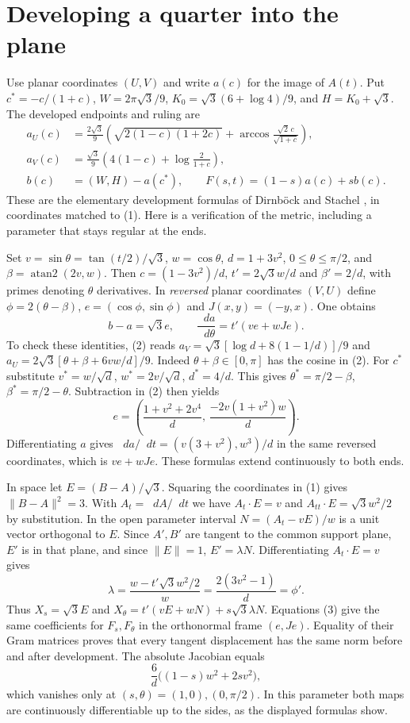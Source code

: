 \documentclass[11pt,letterpaper]{article}
\newcommand{\heading}[1]{\section*{\color{ink}#1}}
\newcommand{\norm}[1]{\lVert #1\rVert}
\newcommand{\rt}{\sqrt{3}}
\newcommand{\dd}{\mathop{}\!d}
\begin{document}
\newpage
\heading{Developing a quarter into the plane}
Use planar coordinates $(U,V)$ and write $a(c)$ for the image of $A(t)$. Put $c^*=-c/(1+c)$, $W=2\pi\rt/9$, $K_0=\rt(6+\log4)/9$, and $H=K_0+\rt$. The developed endpoints and ruling are
\begin{align}
 a_U(c)&=\frac{2\rt}{9}\left(\sqrt{2(1-c)(1+2c)}
              +\arccos\frac{\sqrt2\,c}{\sqrt{1+c}}\right),\nonumber\\
 a_V(c)&=\frac{\rt}{9}\left(4(1-c)+\log\frac2{1+c}\right),\nonumber\\
 b(c)&=(W,H)-a(c^*),\qquad F(s,t)=(1-s)a(c)+s b(c).
 \tag{2}
\end{align}
These are the elementary development formulas of Dirnböck and Stachel \cite{ds}, in coordinates matched to (1). Here is a verification of the metric, including a parameter that stays regular at the ends.

Set $v=\sin\theta=\tan(t/2)/\rt$, $w=\cos\theta$, $d=1+3v^2$, $0\le\theta\le\pi/2$, and $\beta=\operatorname{atan2}(2v,w)$. Then $c=(1-3v^2)/d$, $t'=2\rt w/d$ and $\beta'=2/d$, with primes denoting $\theta$ derivatives. In \emph{reversed} planar coordinates $(V,U)$ define $\phi=2(\theta-\beta)$, $e=(\cos\phi,\sin\phi)$ and $J(x,y)=(-y,x)$. One obtains
\[
 b-a=\rt e,\qquad
 \frac{\dd a}{\dd\theta}=t'(v e+w J e).
 \tag{3}
\]
To check these identities, (2) reads $a_V=\rt[\log d+8(1-1/d)]/9$ and $a_U=2\rt[\theta+\beta+6vw/d]/9$. Indeed $\theta+\beta\in[0,\pi]$ has the cosine in (2). For $c^*$ substitute $v^*=w/\sqrt d$, $w^*=2v/\sqrt d$, $d^*=4/d$. This gives $\theta^*=\pi/2-\beta$, $\beta^*=\pi/2-\theta$. Subtraction in (2) then yields
\[
 e=\left(\frac{1+v^2+2v^4}{d},\,\frac{-2v(1+v^2)w}{d}\right).
\]
Differentiating $a$ gives $\dd a/\dd t=(v(3+v^2),w^3)/d$ in the same reversed coordinates, which is $v e+wJe$. These formulas extend continuously to both ends.

In space let $E=(B-A)/\rt$. Squaring the coordinates in (1) gives $\norm{B-A}^2=3$. With $A_t=\dd A/\dd t$ we have $A_t\cdot E=v$ and $A_{tt}\cdot E=\rt w^2/2$ by substitution. In the open parameter interval $N=(A_t-vE)/w$ is a unit vector orthogonal to $E$. Since $A',B'$ are tangent to the common support plane, $E'$ is in that plane, and since $\norm E=1$, $E'=\lambda N$. Differentiating $A_t\cdot E=v$ gives
\[
 \lambda=\frac{w-t'\rt w^2/2}{w}=\frac{2(3v^2-1)}{d}=\phi'.
\]
Thus $X_s=\rt E$ and $X_\theta=t'(vE+wN)+s\rt\lambda N$. Equations (3) give the same coefficients for $F_s,F_\theta$ in the orthonormal frame $(e,Je)$. Equality of their Gram matrices proves that every tangent displacement has the same norm before and after development. The absolute Jacobian equals
\[
 \frac{6}{d}\big((1-s)w^2+2s v^2\big),
 \tag{4}
\]
which vanishes only at $(s,\theta)=(1,0),(0,\pi/2)$. In this parameter both maps are continuously differentiable up to the sides, as the displayed formulas show.
\end{document}
